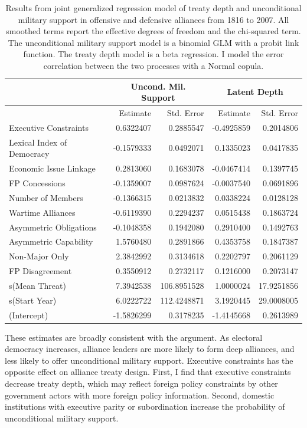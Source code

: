 \documentclass[12pt]{article}
\begin{document}
\begin{table}[ht]
\centering
\begin{tabular}{lrrrr}
  & \multicolumn{2}{c}{Uncond. Mil. Support} & \multicolumn{2}{c}{Latent Depth}\\ \hline
 & Estimate & Std. Error & Estimate & Std. Error \\ 
  \hline 
  Executive Constraints & 0.6322407 & 0.2885547 & -0.4925859 & 0.2014806 \\ 
  Lexical Index of Democracy & -0.1579333 & 0.0492071 & 0.1335023 & 0.0417835 \\ 
  Economic Issue Linkage & 0.2813060 & 0.1683078 & -0.0467414 & 0.1397745 \\ 
  FP Concessions & -0.1359007 & 0.0987624 & -0.0037540 & 0.0691896 \\ 
  Number of Members & -0.1366315 & 0.0213832 & 0.0338224 & 0.0128128 \\ 
  Wartime Alliances & -0.6119390 & 0.2294237 & 0.0515438 & 0.1863724 \\ 
  Asymmetric Obligations & -0.1048358 & 0.1942080 & 0.2910400 & 0.1492763 \\ 
  Asymmetric Capability & 1.5760480 & 0.2891866 & 0.4353758 & 0.1847387 \\ 
  Non-Major Only & 2.3842992 & 0.3134618 & 0.2202797 & 0.2061129 \\ 
  FP Disagreement & 0.3550912 & 0.2732117 & 0.1216000 & 0.2073147 \\ 
  s(Mean Threat) & 7.3942538 & 106.8951528 & 1.0000024 & 17.9251856 \\ 
  s(Start Year) & 6.0222722 & 112.4248871 & 3.1920445 & 29.0008005 \\ 
  (Intercept) & -1.5826299 & 0.3178235 & -1.4145668 & 0.2613989 \\
   \hline
\end{tabular}
\caption{Results from joint generalized regression model of treaty depth and unconditional military support in 
         offensive and defensive alliances from 1816 to 2007. 
                     All smoothed terms report the effective degrees of freedom and the chi-squared term. 
                     The unconditional military support model is a binomial GLM with a probit link function. 
                     The treaty depth model is a beta regression. 
                     I model the error correlation between the two processes with a Normal copula.} 
\label{tab:gjrm-res}
\end{table}


These estimates are broadly consistent with the argument. 
As electoral democracy increases, alliance leaders are more likely to form deep alliances, and less likely to offer unconditional military support. 
Executive constraints has the opposite effect on alliance treaty design.
First, I find that executive constraints decrease treaty depth, which may reflect foreign policy constraints by other government actors with more foreign policy information.
Second, domestic institutions with executive parity or subordination increase the probability of unconditional military support.  
\end{document}
